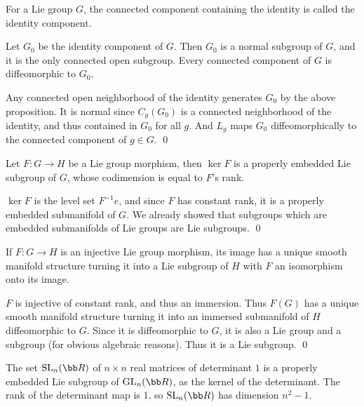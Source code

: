 \eproof

For a Lie group $G$, the connected component containing the identity is called the {\emphcolor identity component}.

\bprop

    Let $G_0$ be the identity component of $G$.
    Then $G_0$ is a normal subgroup of $G$, and it is the only connected open subgroup.
    Every connected component of $G$ is diffeomorphic to $G_0$.

\eprop

\bproof

    Any connected open neighborhood of the identity generates $G_0$ by the above proposition.
    It is normal since $C_g(G_0)$ is a connected neighborhood of the identity, and thus contained in $G_0$ for all $g$.
    And $L_g$ maps $G_0$ diffeomorphically to the connected component of $g\in G$.
    \qed

\eproof

\bprop

    Let $F\colon G\to H$ be a Lie group morphism, then $\ker F$ is a properly embedded Lie subgroup of $G$, whose codimension is equal to
    $F$'s rank.

\eprop

\bproof

    $\ker F$ is the level set $F^{-1}e$, and since $F$ has constant rank, it is a properly embedded submanifold of $G$.
    We already showed that subgroups which are embedded submanifolds of Lie groups are Lie subgroups.
    \qed

\eproof

\bprop

    If $F\colon G\to H$ is an injective Lie group morphism, its image has a unique smooth manifold structure turning it into a Lie
    subgroup of $H$ with $F$ an isomorphism onto its image.

\eprop

\bproof

    $F$ is injective of constant rank, and thus an immersion.
    Thus $F(G)$ has a unique smooth manifold structure turning it into an immersed submanifold of $H$ diffeomorphic to $G$.
    Since it is diffeomorphic to $G$, it is also a Lie group and a subgroup (for obvious algebraic reasons).
    Thus it is a Lie subgroup.
    \qed

\eproof

\bexam

    The set $\Sl_n(\bR)$ of $n\times n$ real matrices of determinant $1$ is a properly embedded Lie subgroup of $\gl_n(\bR)$, as the kernel
    of the determinant.
    The rank of the determinant map is $1$, so $\Sl_n(\bR)$ has dimension $n^2-1$.


